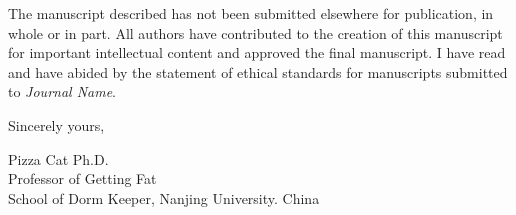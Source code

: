 \documentclass{article}
\newcommand{\journalname}{\textit{Journal Name}}
\begin{document}
The manuscript described has not been submitted elsewhere for publication, in whole or in part. All authors have contributed to the creation of this manuscript for important intellectual content and approved the final manuscript. I have read and have abided by the statement of ethical standards for manuscripts submitted to \journalname.

\bigskip %

Sincerely yours,

\vspace{20pt} %

Pizza Cat Ph.D.\\
Professor of Getting Fat\\
School of Dorm Keeper, Nanjing University. China
\end{document}
